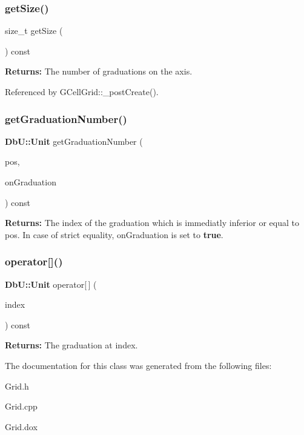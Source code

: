 \subsubsection{\texorpdfstring{get\+Size()}{getSize()}}
{\footnotesize\ttfamily size\+\_\+t get\+Size (\begin{DoxyParamCaption}{ }\end{DoxyParamCaption}) const\hspace{0.3cm}{\ttfamily [inline]}}

{\bfseries Returns\+:} The number of graduations on the axis. 

Referenced by G\+Cell\+Grid\+::\+\_\+post\+Create().

\mbox{\label{classKatabatic_1_1BaseGrid_1_1Axis_a2a6bd524227130d8ccf482aa2c484a42}} 
\subsubsection{\texorpdfstring{get\+Graduation\+Number()}{getGraduationNumber()}}
{\footnotesize\ttfamily \textbf{ Db\+U\+::\+Unit} get\+Graduation\+Number (\begin{DoxyParamCaption}\item[{\textbf{ Db\+U\+::\+Unit}}]{pos,  }\item[{bool \&}]{on\+Graduation }\end{DoxyParamCaption}) const}

{\bfseries Returns\+:} The index of the graduation which is immediatly inferior or equal to {\ttfamily pos}. In case of strict equality, {\ttfamily on\+Graduation} is set to {\bfseries true}. \mbox{\label{classKatabatic_1_1BaseGrid_1_1Axis_a074a4f61306b88baac6bbf54b0b3212c}} 
\subsubsection{\texorpdfstring{operator[]()}{operator[]()}}
{\footnotesize\ttfamily \textbf{ Db\+U\+::\+Unit} operator\mbox{[}$\,$\mbox{]} (\begin{DoxyParamCaption}\item[{unsigned int}]{index }\end{DoxyParamCaption}) const\hspace{0.3cm}{\ttfamily [inline]}}

{\bfseries Returns\+:} The graduation at {\ttfamily index}. 

The documentation for this class was generated from the following files\+:\begin{DoxyCompactItemize}
\item 
Grid.\+h\item 
Grid.\+cpp\item 
Grid.\+dox\end{DoxyCompactItemize}
